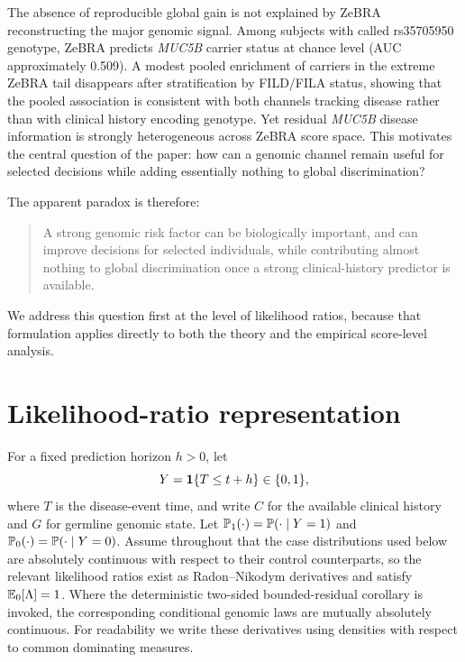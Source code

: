 The absence of reproducible global gain is not explained by ZeBRA reconstructing the major genomic signal. Among subjects with called rs35705950 genotype, ZeBRA predicts \textit{MUC5B} carrier status at chance level (AUC approximately 0.509). A modest pooled enrichment of carriers in the extreme ZeBRA tail disappears after stratification by FILD/FILA status, showing that the pooled association is consistent with both channels tracking disease rather than with clinical history encoding genotype. Yet residual \textit{MUC5B} disease information is strongly heterogeneous across ZeBRA score space. This motivates the central question of the paper: how can a genomic channel remain useful for selected decisions while adding essentially nothing to global discrimination?

The apparent paradox is therefore:
\begin{quote}
A strong genomic risk factor can be biologically important, and can improve decisions for selected individuals, while contributing almost nothing to global discrimination once a strong clinical-history predictor is available.
\end{quote}

We address this question first at the level of likelihood ratios, because that formulation applies directly to both the theory and the empirical score-level analysis.

\section{Likelihood-ratio representation}

For a fixed prediction horizon $h>0$, let
\begin{equation}
Y=\mathbf{1}\{T\le t+h\}\in\{0,1\},
\end{equation}
where $T$ is the disease-event time, and write $C$ for the available clinical history and $G$ for germline genomic state. Let $\mathbb{P}_1(\cdot)=\mathbb{P}(\cdot\mid Y=1)$ and $\mathbb{P}_0(\cdot)=\mathbb{P}(\cdot\mid Y=0)$. Assume throughout that the case distributions used below are absolutely continuous with respect to their control counterparts, so the relevant likelihood ratios exist as Radon--Nikodym derivatives and satisfy $\mathbb{E}_0[\Lambda]=1$. Where the deterministic two-sided bounded-residual corollary is invoked, the corresponding conditional genomic laws are mutually absolutely continuous. For readability we write these derivatives using densities with respect to common dominating measures.

